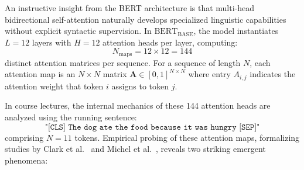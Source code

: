 \documentclass[../../../main.tex]{subfiles}
\begin{document}
An instructive insight from the BERT architecture is that multi-head bidirectional self-attention naturally develops specialized linguistic capabilities without explicit syntactic supervision. In $\text{BERT}_{\text{BASE}}$, the model instantiates $L=12$ layers with $H=12$ attention heads per layer, computing:
\begin{equation}
N_{\text{maps}} = 12 \times 12 = 144
\label{eq:bert_total_attention_heads}
\end{equation}
distinct attention matrices per sequence. For a sequence of length $N$, each attention map is an $N \times N$ matrix $\mathbf{A} \in [0, 1]^{N \times N}$ where entry $A_{i,j}$ indicates the attention weight that token $i$ assigns to token $j$.

In course lectures, the internal mechanics of these 144 attention heads are analyzed using the running sentence:
\begin{equation*}
\texttt{"[CLS] The dog ate the food because it was hungry [SEP]"}
\end{equation*}
comprising $N=11$ tokens. Empirical probing of these attention maps, formalizing studies by Clark et al.~\cite{clark2019what} and Michel et al.~\cite{michel2019sixteen}, reveals two striking emergent phenomena:
\end{document}
